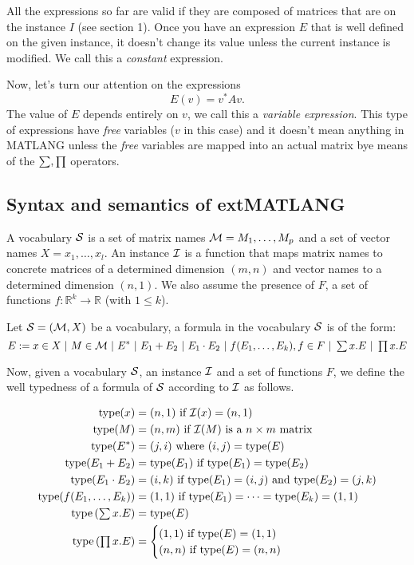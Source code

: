 All the expressions so far are valid if they are composed of matrices that are on the instance $I$ (see section 1). Once you have an expression $E$ that is well defined on the given instance, it doesn't change its value unless the current instance is modified. We call this a \textit{constant} expression.

Now, let's turn our attention on the expressions $$E(v)=v^* Av.$$ The value of $E$ depends entirely on $v$, we call this a \textit{variable expression}. This type of expressions have \textit{free} variables ($v$ in this case) and it doesn't mean anything in MATLANG unless the \textit{free} variables are mapped into an actual matrix bye means of the $\textstyle\sum,\textstyle\prod$ operators.

\subsection{Syntax and semantics of  extMATLANG}

A vocabulary $\mathcal{S}$ is a set of matrix names $\mathcal{M}=M_1,\ldots, M_p$ and a set of vector names $X=x_1,\ldots, x_l$.
An instance $\mathcal{I}$ is a function that maps matrix names to concrete matrices of a determined dimension $(m,n)$ and vector names to a determined dimension $(n, 1)$. 
We also assume the presence of $F$, a set of functions $f:\mathbb{R}^{k}\rightarrow\mathbb{R}$ (with $1\leq k$).

Let $\mathcal{S}=(\mathcal{M}, X)$ be a vocabulary, a formula in the vocabulary $\mathcal{S}$ is of the form:
$$
E:= x\in X \ |\ M\in \cM \ |\  E^* \ |\ E_1+E_2 \ |\  E_1\cdot E_2 \ |\  f(E_1,\ldots, E_k), f\in F \ |\  \ssum x. E \ |\  \sprod x. E
$$

Now, given a vocabulary $\mathcal{S}$, an instance $\mathcal{I}$ and a set of functions $F$, we define the well typedness of a formula of $\mathcal{S}$ according to $\mathcal{I}$ as follows. 

\begin{align*}
\text{type}(x) &= (n,1) \text{ if } \mathcal{I}(x) = (n, 1) \\
\text{type}(M) &= (n,m) \text{ if } \mathcal{I}(M) \text{ is a } n\times m \text{ matrix } \\
\text{type}(E^*)&=(j,i) \text{ where } (i,j)=\text{type}(E) \\
\text{type}(E_1 + E_2) &= \text{type}(E_1) \text{ if } \text{type}(E_1)=\text{type}(E_2) \\
\text{type}(E_1\cdot E_2)&= (i,k) \text{ if } \text{type}(E_1)=(i,j)\text{ and type}(E_2)=(j,k) \\
\text{type}(f(E_1,\ldots, E_k))&=(1,1) \text{ if } \text{type}(E_1)=\cdots =\text{type}(E_k)=(1,1) \\
\text{type}\left(\textstyle\sum x.E\right) &= \text{type}(E) \\
\text{type}\left(\textstyle\prod x. E\right) &=
\begin{cases}
               (1,1) \text{ if } \text{type}(E)=(1,1) \\
               (n,n) \text{ if } \text{type}(E)=(n,n)
            \end{cases}
\end{align*}

